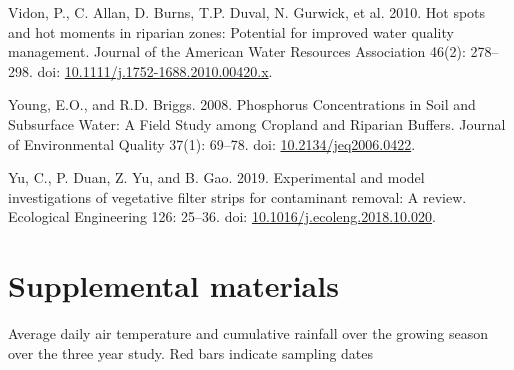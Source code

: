 \documentclass[
]{agujournal2019}
\newlength{\cslhangindent}
\newenvironment{CSLReferences}[2] %
 {\begin{list}{}{%
  \setlength{\itemindent}{0pt}
  \setlength{\leftmargin}{0pt}
  \setlength{\parsep}{0pt}
  \ifodd #1
   \setlength{\leftmargin}{\cslhangindent}
   \setlength{\itemindent}{-1\cslhangindent}
  \fi
  \setlength{\itemsep}{#2\baselineskip}}}
 {\end{list}}
\begin{document}
\begin{CSLReferences}{1}{1}
Vidon, P., C. Allan, D. Burns, T.P. Duval, N. Gurwick, et al. 2010. Hot
spots and hot moments in riparian zones: Potential for improved water
quality management. Journal of the American Water Resources Association
46(2): 278--298. doi:
\href{https://doi.org/10.1111/j.1752-1688.2010.00420.x}{10.1111/j.1752-1688.2010.00420.x}.

Young, E.O., and R.D. Briggs. 2008. Phosphorus Concentrations in Soil
and Subsurface Water: A Field Study among Cropland and Riparian Buffers.
Journal of Environmental Quality 37(1): 69--78. doi:
\href{https://doi.org/10.2134/jeq2006.0422}{10.2134/jeq2006.0422}.

Yu, C., P. Duan, Z. Yu, and B. Gao. 2019. Experimental and model
investigations of vegetative filter strips for contaminant removal: A
review. Ecological Engineering 126: 25--36. doi:
\href{https://doi.org/10.1016/j.ecoleng.2018.10.020}{10.1016/j.ecoleng.2018.10.020}.

\end{CSLReferences}

\section*{Supplemental materials}\label{supplemental-materials}

\begin{suppfig}


\caption{\label{suppfig-weather-plot}Average daily air temperature and
cumulative rainfall over the growing season over the three year study.
Red bars indicate sampling dates}

\end{suppfig}%
\end{document}
